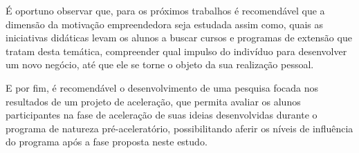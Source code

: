 É oportuno observar que, para os próximos trabalhos é recomendável que a dimensão da motivação empreendedora seja estudada assim como, quais as iniciativas didáticas levam os alunos a buscar cursos e programas de extensão que tratam desta temática, compreender qual impulso do indivíduo para desenvolver um novo negócio, até que ele se torne o objeto da sua realização pessoal.

E por fim, é recomendável o desenvolvimento de uma pesquisa focada nos resultados de um projeto de aceleração, que permita avaliar os alunos participantes na fase de aceleração de suas ideias desenvolvidas durante o programa de natureza pré-aceleratório, possibilitando aferir os níveis de influência do programa após a fase proposta neste estudo.
